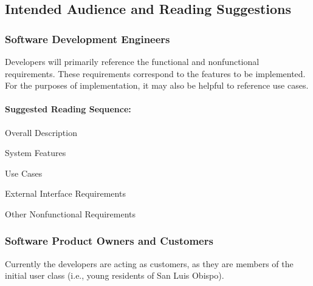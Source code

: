 \documentclass[12pt,oneside,letterpaper]{article}
\begin{document}
\subsection{Intended Audience and Reading Suggestions}

\subsubsection{Software Development Engineers}
Developers will primarily reference the functional and nonfunctional requirements. These requirements correspond to the features to be implemented. For the purposes of implementation, it may also be helpful to reference use cases.

\paragraph{Suggested Reading Sequence:}
\begin{compactenum}
\item Overall Description
\item System Features
\item Use Cases
\item External Interface Requirements
\item Other Nonfunctional Requirements
\end{compactenum}

\subsubsection{Software Product Owners and Customers}
Currently the developers are acting as customers, as they are members of the initial user class (i.e., young residents of San Luis Obispo).

\end{document}
